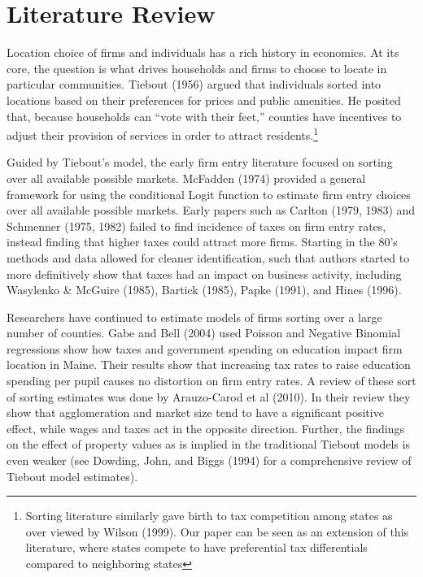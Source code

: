 
\section{Literature Review}

Location choice of firms and individuals has a rich history in economics. At its core, the question is what drives households and firms to choose to locate in particular communities. Tiebout (1956) argued that individuals sorted into locations based on their preferences for prices and public amenities. He posited that, because households can “vote with their feet,” counties have incentives to adjust their provision of services in order to attract residents.\footnote{Sorting literature similarly gave birth to tax competition among states as over viewed by Wilson (1999). Our paper can be seen as an extension of this literature, where states compete to have preferential tax differentials compared to neighboring states}

Guided by Tiebout’s model, the early firm entry literature focused on sorting over all available possible markets.  McFadden (1974) provided a general framework for using the conditional Logit function to estimate firm entry choices over all available possible markets. Early papers such as Carlton (1979, 1983) and Schmenner (1975, 1982) failed to find incidence of taxes on firm entry rates, instead finding that higher taxes could attract more firms. Starting in the 80's methods and data allowed for cleaner identification, such that authors started to more definitively show that taxes had an impact on business activity, including Wasylenko \& McGuire (1985), Bartick (1985), Papke (1991), and Hines (1996).

Researchers have continued to estimate models of firms sorting over a large number of counties. Gabe and Bell (2004) used Poisson and Negative Binomial regressions show how taxes and government spending on education impact firm location in Maine. Their results show that increasing tax rates to raise education spending per pupil causes no distortion on firm entry rates. A review of these sort of sorting estimates was done by Arauzo-Carod et al (2010). In their review they show that agglomeration and market size tend to have a significant positive effect, while wages and taxes act in the opposite direction. Further, the findings on the effect of property values as is implied in the traditional Tiebout models is even weaker (see Dowding, John, and Biggs (1994) for a comprehensive review of Tiebout model estimates).

